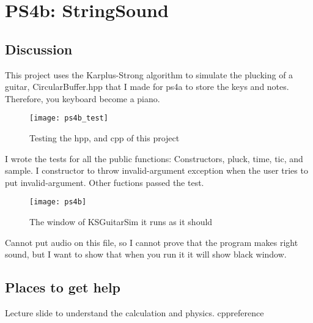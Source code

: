 \section{PS4b: StringSound}\label{sec:ps4b}

\subsection{Discussion}\label{sec:ps4b:disc}

This project uses the Karplus-Strong algorithm to simulate the plucking of a guitar, CircularBuffer.hpp that I made for ps4a to store the keys and notes. Therefore, you keyboard become a piano.

\begin{figure}[tbh]
	\centering
	\texttt{[image: ps4b\_test]}
	\caption{Testing the hpp, and cpp of this project}
	\label{fig:ps4b_test}
\end{figure}

I wrote the tests for all the public functions: Constructors, pluck, time, tic, and sample. I constructor to throw invalid-argument exception when the user tries to put invalid-argument. Other fuctions passed the test.

\begin{figure}[tbh]
	\centering
	\texttt{[image: ps4b]}
	\caption{The window of KSGuitarSim it runs as it should}
	\label{fig:ps4b}
\end{figure}

Cannot put audio on this file, so I cannot prove that the program makes right sound, but I want to show that when you run it it will show black window. 

\subsection{Places to get help}

Lecture slide to understand the calculation and physics.
cppreference




